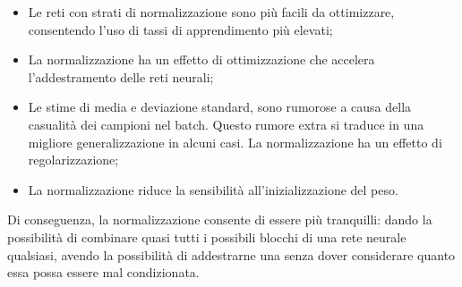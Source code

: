 \begin{itemize}
    \item Le reti con strati di normalizzazione sono più facili da ottimizzare, consentendo l'uso di tassi di apprendimento più elevati;
    \item La normalizzazione ha un effetto di ottimizzazione che accelera l'addestramento delle reti neurali;
    \item Le stime di media e deviazione standard, sono rumorose a causa della casualità dei campioni nel batch. Questo rumore extra si traduce in una migliore generalizzazione in alcuni casi. La normalizzazione ha un effetto di regolarizzazione;
    \item La normalizzazione riduce la sensibilità all'inizializzazione del peso.
\end{itemize}

Di conseguenza, la normalizzazione consente di essere più tranquilli: dando la possibilità di combinare quasi tutti i possibili blocchi di una rete neurale qualsiasi, avendo la possibilità di addestrarne una senza dover considerare quanto essa possa essere mal condizionata.